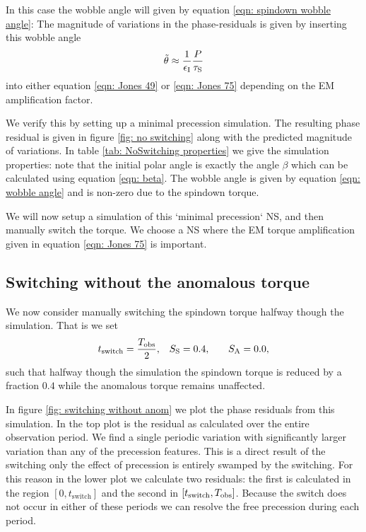 \documentclass[../full_thesis/full_thesis.tex]{subfiles}
\newcommand{\thisdir}{../inertial_frame}
\begin{document}
In this case the wobble angle will given by equation \eqref{eqn: spindown wobble angle}:
The magnitude of variations in the phase-residuals is given by inserting this
wobble angle
\begin{equation}
\tilde{\theta} \approx \frac{1}{\epsilon_{\mathrm{I}}}{\frac{P}{\tau_{\mathrm{S}}}}
\end{equation} 
into either equation \eqref{eqn: Jones 49} or \eqref{eqn: Jones 75} depending 
on the EM amplification factor.

We verify this by setting up a minimal precession simulation. The resulting
phase residual is given in figure \ref{fig: no switching} along with the
predicted magnitude of variations. In table \ref{tab: NoSwitching properties}
we give the simulation properties: note that the initial polar angle is exactly
the angle $\beta$ which can be calculated using equation \eqref{eqn: beta}. 
The wobble angle is given by equation \eqref{eqn: wobble angle} and is non-zero
due to the spindown torque. 

\begin{figure}[htb]
\begin{floatrow}
\capbtabbox{%
  
}{%
  \caption{}%
  \label{tab: NoSwitching properties}
}
\end{floatrow}
\end{figure}


We will now setup a simulation of this `minimal precession` NS, and then 
manually switch the torque. We choose a NS where the EM torque amplification
given in equation \eqref{eqn: Jones 75} is important.

\subsection{Switching without the anomalous torque}
We now consider manually switching the spindown torque halfway though the simulation.
That is we set
\begin{align}
    t_{\mathrm{switch}} = \frac{T_{\textrm{obs}}}{2}, &&& S_{\mathrm{S}} = 0.4, &&& S_{\mathrm{A}} = 0.0,
\end{align}
such that halfway though the simulation the spindown torque is reduced by a
fraction $0.4$ while the anomalous torque remains unaffected. 

In figure \ref{fig: switching without anom} we plot the phase residuals from
this simulation. In the top plot is the residual as calculated over the entire
observation period. We find a single periodic variation with significantly
larger variation than any of the precession features. This is a direct result
of the switching only%
the
effect of precession is entirely swamped by the switching. For this reason in
the lower plot we calculate two residuals: the first is calculated
in the region $[0, t_{\mathrm{switch}}]$ and the second in $[t_{\mathrm{switch}}, T_{\textrm{obs}}]$.
Because the switch does not occur in either of these periods we can resolve the
free precession during each period.
\end{document}
